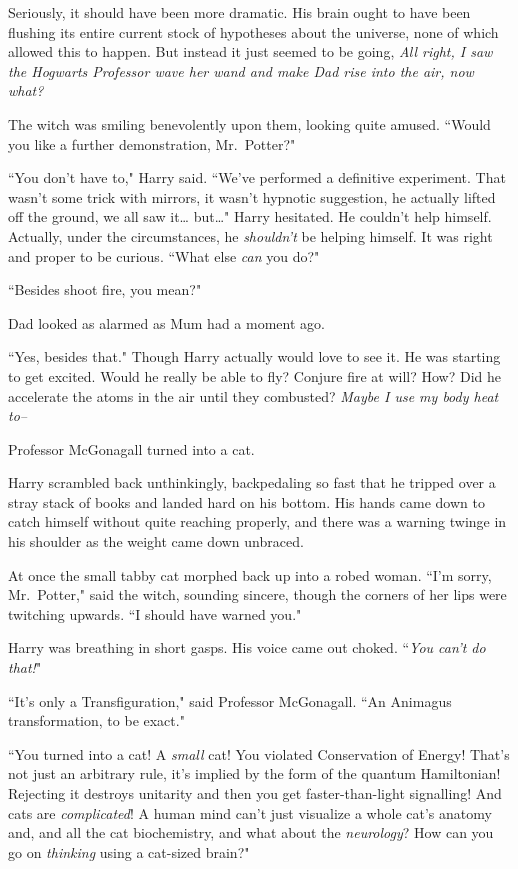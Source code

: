 Seriously, it should have been more dramatic. His brain ought to have been flushing its entire current stock of hypotheses about the universe, none of which allowed this to happen. But instead it just seemed to be going, \emph{All right, I saw the Hogwarts Professor wave her wand and make Dad rise into the air, now what?}

The witch was smiling benevolently upon them, looking quite amused. ``Would you like a further demonstration, Mr.~Potter?"

``You don't have to," Harry said. ``We've performed a definitive experiment. That wasn't some trick with mirrors, it wasn't hypnotic suggestion, he actually lifted off the ground, we all saw it{\ldots} but{\ldots}" Harry hesitated. He couldn't help himself. Actually, under the circumstances, he \emph{shouldn't} be helping himself. It was right and proper to be curious. ``What else \emph{can} you do?"

``Besides shoot fire, you mean?"

Dad looked as alarmed as Mum had a moment ago.

``Yes, besides that." Though Harry actually would love to see it. He was starting to get excited. Would he really be able to fly? Conjure fire at will? How? Did he accelerate the atoms in the air until they combusted? \emph{Maybe I use my body heat to\---}

Professor McGonagall turned into a cat.

Harry scrambled back unthinkingly, backpedaling so fast that he tripped over a stray stack of books and landed hard on his bottom. His hands came down to catch himself without quite reaching properly, and there was a warning twinge in his shoulder as the weight came down unbraced.

At once the small tabby cat morphed back up into a robed woman. ``I'm sorry, Mr.~Potter," said the witch, sounding sincere, though the corners of her lips were twitching upwards. ``I should have warned you."

Harry was breathing in short gasps. His voice came out choked. ``\emph{You can't \emph{do} that!}"

``It's only a Transfiguration," said Professor McGonagall. ``An Animagus transformation, to be exact."

``You turned into a cat! A \emph{small} cat! You violated Conservation of Energy! That's not just an arbitrary rule, it's implied by the form of the quantum Hamiltonian! Rejecting it destroys unitarity and then you get faster-than-light signalling! And cats are \emph{complicated}! A human mind can't just visualize a whole cat's anatomy and, and all the cat biochemistry, and what about the \emph{neurology}? How can you go on \emph{thinking} using a cat-sized brain?"

